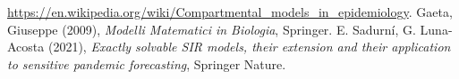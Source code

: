 \cleardoublepage
{}
{}
\begin{thebibliography}{9}
 \url{https://en.wikipedia.org/wiki/Compartmental_models_in_epidemiology}.
 Gaeta, Giuseppe (2009), \emph{Modelli Matematici in Biologia}, Springer.
 E. Sadurní, G. Luna-Acosta (2021), \emph{Exactly solvable SIR models, their 
extension and their application to sensitive pandemic forecasting}, Springer Nature.
\end{thebibliography}
